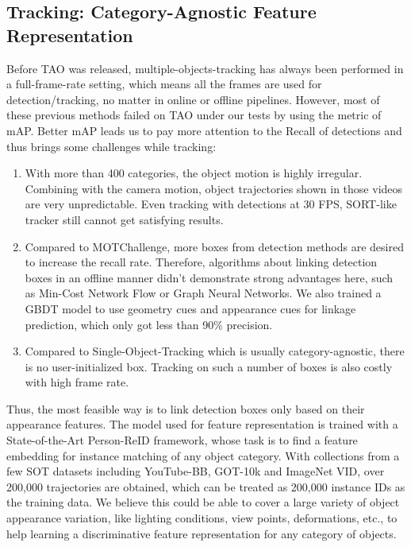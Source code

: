 \documentclass[runningheads]{llncs}
\begin{document}
\subsection{Tracking: Category-Agnostic Feature Representation}
Before TAO was released, multiple-objects-tracking has always been performed in a full-frame-rate setting, which means all the frames are used for detection/tracking, no matter in online or offline pipelines. However, most of these previous methods failed on TAO under our tests by using the metric of mAP. Better mAP leads us to pay more attention to the Recall of detections and thus brings some challenges while tracking:
\begin{enumerate}
\item With more than 400 categories, the object motion is highly irregular. Combining with the camera motion, object trajectories shown in those videos are very unpredictable. Even tracking with detections at 30 FPS, SORT-like tracker still cannot get satisfying results. 
\item Compared to MOTChallenge\cite{MOT16}, more boxes from detection methods are desired to increase the recall rate. Therefore, algorithms about linking detection boxes in an offline manner didn't demonstrate strong advantages here, such as Min-Cost Network Flow or Graph Neural Networks. We also trained a GBDT model to use geometry cues and appearance cues for linkage prediction, which only got less than 90\% precision.
\item Compared to Single-Object-Tracking which is usually category-agnostic, there is no user-initialized box. Tracking on such a number of boxes is also costly with high frame rate. 
\end{enumerate}

Thus, the most feasible way is to link detection boxes only based on their appearance features. 
The model used for feature representation is trained with a State-of-the-Art Person-ReID framework, whose task is to find a feature embedding for instance matching of any object category. With collections from a few SOT datasets including YouTube-BB\cite{youtubebb}, GOT-10k\cite{got10k} and ImageNet VID\cite{ilsvrc}, over 200,000 trajectories are obtained, which can be treated as 200,000 instance IDs as the training data. We believe this could be able to cover a large variety of object appearance variation, like lighting conditions, view points, deformations, etc., to help learning a discriminative feature representation for any category of objects. 
\end{document}
